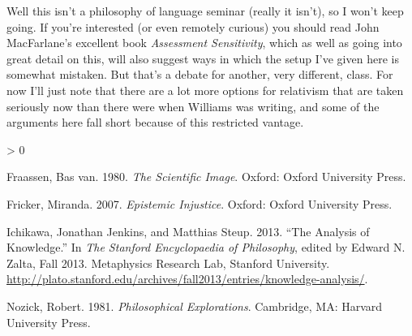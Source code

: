 \documentclass[
]{article}
\newlength{\cslhangindent}
\newenvironment{CSLReferences}[2] %
 {%
  \setlength{\parindent}{0pt}
  \ifodd #1 \everypar{\setlength{\hangindent}{\cslhangindent}}\ignorespaces\fi
  \ifnum #2 > 0
  \setlength{\parskip}{#2\baselineskip}
  \fi
 }%
 {}
\begin{document}
Well this isn't a philosophy of language seminar (really it isn't), so I
won't keep going. If you're interested (or even remotely curious) you
should read John MacFarlane's excellent book \emph{Assessment
Sensitivity}, which as well as going into great detail on this, will
also suggest ways in which the setup I've given here is somewhat
mistaken. But that's a debate for another, very different, class. For
now I'll just note that there are a lot more options for relativism that
are taken seriously now than there were when Williams was writing, and
some of the arguments here fall short because of this restricted
vantage.

\hypertarget{refs}{}
\begin{CSLReferences}{1}{0}
\leavevmode\hypertarget{ref-vanFraassen1980b}{}%
Fraassen, Bas van. 1980. \emph{The Scientific Image}. Oxford: Oxford
University Press.

\leavevmode\hypertarget{ref-Fricker2007}{}%
Fricker, Miranda. 2007. \emph{Epistemic Injustice}. Oxford: Oxford
University Press.

\leavevmode\hypertarget{ref-SEPAnalysisKnowledge}{}%
Ichikawa, Jonathan Jenkins, and Matthias Steup. 2013. {``The Analysis of
Knowledge.''} In \emph{The Stanford Encyclopaedia of Philosophy}, edited
by Edward N. Zalta, Fall 2013. Metaphysics Research Lab, Stanford
University.
\url{http://plato.stanford.edu/archives/fall2013/entries/knowledge-analysis/}.

\leavevmode\hypertarget{ref-Nozick1981}{}%
Nozick, Robert. 1981. \emph{Philosophical Explorations}. Cambridge, MA:
Harvard University Press.

\end{CSLReferences}
\end{document}
